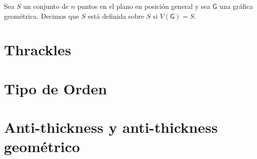 Sea $S$ un conjunto de $n$ puntos en el plano en posición general y sea $\mathsf{G}$
una gráfica geométrica. Decimos que $S$ está definida sobre $S$ si $V(\mathsf{G}) = S$.


\section{Thrackles}
\section{Tipo de Orden}
\section{Anti-thickness y anti-thickness geométrico}
